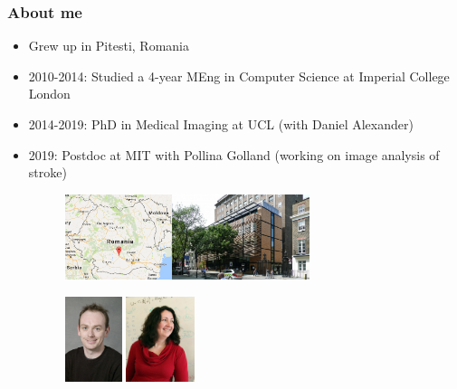 \documentclass[8pt,xcolor=table]{beamer}
\begin{document}
\begin{frame}
\frametitle{About me}

\begin{itemize}
 \item Grew up in Pitesti, Romania
  \item 2010-2014: Studied a 4-year MEng in Computer Science at Imperial College London
  \item 2014-2019: PhD in Medical Imaging at UCL (with Daniel Alexander)
  \item 2019: Postdoc at MIT with Pollina Golland (working on image analysis of stroke)

  \begin{figure}
  \vspace{1em}
  \includegraphics[height=2.5cm]{pitestiRomania}\hspace{1em}\includegraphics[height=2.5cm,trim=0 0 0 100,clip]{uclFrontEng.jpg} \hspace{1em}
  \end{figure}
 
 \vspace{1em}

 
 
  \begin{figure}
   \centering
    \includegraphics[height=2.5cm]{Danny-Alexander.jpeg}
    \hspace{3em}
    \includegraphics[height=2.5cm]{polina}  
  \end{figure}



\end{itemize}

\end{frame}
\end{document}
